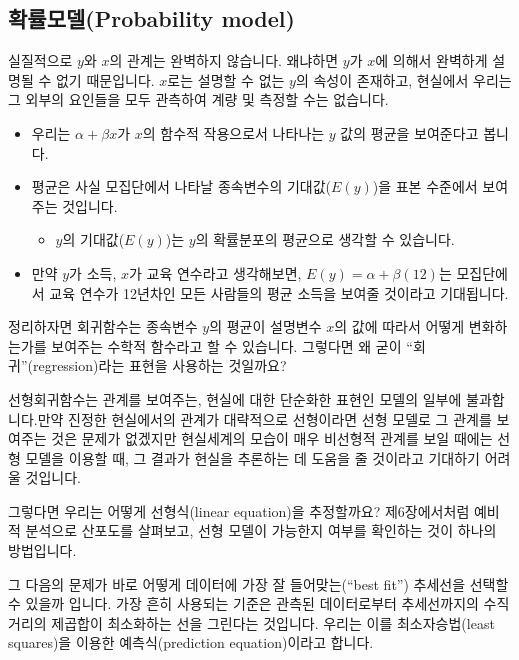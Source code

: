\documentclass[]{book}
\providecommand{\tightlist}{%
  \setlength{\itemsep}{0pt}\setlength{\parskip}{0pt}}
\begin{document}
\hypertarget{uxd655uxb960uxbaa8uxb378probability-model}{%
\subsection{확률모델(Probability model)}\label{uxd655uxb960uxbaa8uxb378probability-model}}

실질적으로 \(y\)와 \(x\)의 관계는 완벽하지 않습니다. 왜냐하면 \(y\)가 \(x\)에 의해서 완벽하게 설명될 수 없기 때문입니다. \(x\)로는 설명할 수 없는 \(y\)의 속성이 존재하고, 현실에서 우리는 그 외부의 요인들을 모두 관측하여 계량 및 측정할 수는 없습니다.

\begin{itemize}
\tightlist
\item
  우리는 \(\alpha + \beta x\)가 \(x\)의 함수적 작용으로서 나타나는 \(y\) 값의 평균을 보여준다고 봅니다.
\item
  평균은 사실 모집단에서 나타날 종속변수의 기대값(\(E(y)\))을 표본 수준에서 보여주는 것입니다.

  \begin{itemize}
  \tightlist
  \item
    \(y\)의 기대값(\(E(y)\))는 \(y\)의 확률분포의 평균으로 생각할 수 있습니다.
  \end{itemize}
\item
  만약 \(y\)가 소득, \(x\)가 교육 연수라고 생각해보면, \(E(y) = \alpha + \beta(12)\)는 모집단에서 교육 연수가 12년차인 모든 사람들의 평균 소득을 보여줄 것이라고 기대됩니다.
\end{itemize}

정리하자면 회귀함수는 종속변수 \(y\)의 평균이 설명변수 \(x\)의 값에 따라서 어떻게 변화하는가를 보여주는 수학적 함수라고 할 수 있습니다. 그렇다면 왜 굳이 ``회귀''(regression)라는 표현을 사용하는 것일까요?

선형회귀함수는 관계를 보여주는, 현실에 대한 단순화한 표현인 모델의 일부에 불과합니다.만약 진정한 현실에서의 관계가 대략적으로 선형이라면 선형 모델로 그 관계를 보여주는 것은 문제가 없겠지만 현실세계의 모습이 매우 비선형적 관계를 보일 때에는 선형 모델을 이용할 때, 그 결과가 현실을 추론하는 데 도움을 줄 것이라고 기대하기 어려울 것입니다.

그렇다면 우리는 어떻게 선형식(linear equation)을 추정할까요? 제6장에서처럼 예비적 분석으로 산포도를 살펴보고, 선형 모델이 가능한지 여부를 확인하는 것이 하나의 방법입니다.

그 다음의 문제가 바로 어떻게 데이터에 가장 잘 들어맞는(``best fit'') 추세선을 선택할 수 있을까 입니다. 가장 흔히 사용되는 기준은 관측된 데이터로부터 추세선까지의 수직 거리의 제곱합이 최소화하는 선을 그린다는 것입니다. 우리는 이를 최소자승법(least squares)을 이용한 예측식(prediction equation)이라고 합니다.
\end{document}
